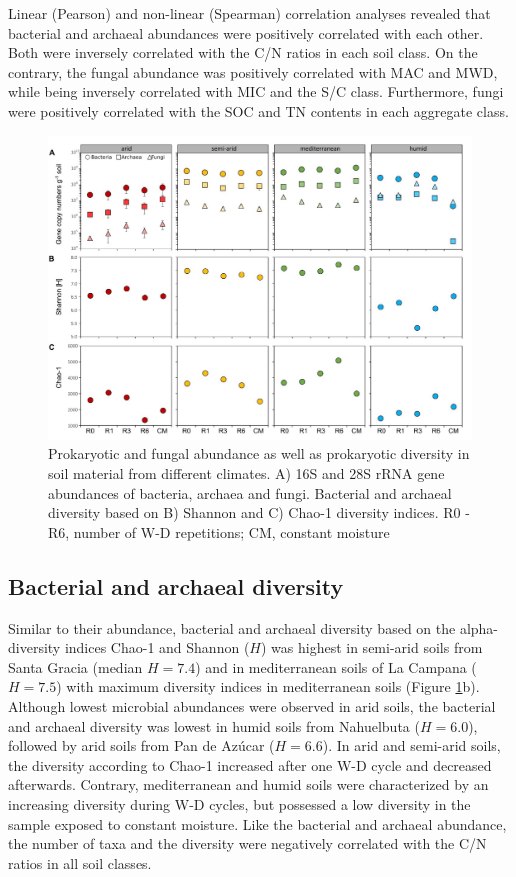 Linear (Pearson) and non-linear (Spearman) correlation analyses revealed that bacterial and archaeal abundances were positively correlated with each other. Both were inversely correlated with the C/N ratios in each soil class. On the contrary, the fungal abundance was positively correlated with MAC and MWD, while being inversely correlated with MIC and the S/C class. Furthermore, fungi were positively correlated with the SOC and TN contents in each aggregate class.

\begin{figure}[H]
	\centering
	\includegraphics[width=1\textwidth]{img/M4-Figure_5.jpg}
	\caption{Prokaryotic and fungal abundance as well as prokaryotic diversity in soil material from different climates. A) 16S and 28S rRNA gene abundances of bacteria, archaea and fungi. Bacterial and archaeal diversity based on B) Shannon and C) Chao-1 diversity indices. R0 - R6, number of W-D repetitions; CM, constant moisture}
	\label{fig:M4-F5}
\end{figure}

\subsection{Bacterial and archaeal diversity}

Similar to their abundance, bacterial and archaeal diversity based on the alpha-diversity indices Chao-1 and Shannon (\(H\)) was highest in semi-arid soils from Santa Gracia (median \(H = 7.4\)) and in mediterranean soils of La Campana (\(H = 7.5\)) with maximum diversity indices in mediterranean soils (Figure \ref{fig:M4-F5}b). Although lowest microbial abundances were observed in arid soils, the bacterial and archaeal diversity was lowest in humid soils from Nahuelbuta (\(H = 6.0\)), followed by arid soils from Pan de Az{\'u}car (\(H = 6.6\)). In arid and semi-arid soils, the diversity according to Chao-1 increased after one W-D cycle and decreased afterwards. Contrary, mediterranean and humid soils were characterized by an increasing diversity during W-D cycles, but possessed a low diversity in the sample exposed to constant moisture. Like the bacterial and archaeal abundance, the number of taxa and the diversity were negatively correlated with the C/N ratios in all soil classes.

